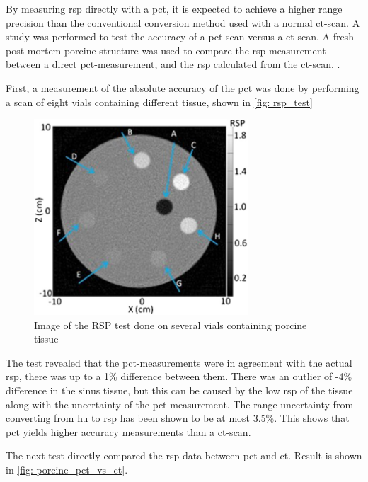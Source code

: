 \documentclass[main.tex]{subfiles}
\begin{document}
By measuring \gls{rsp} directly with a \gls{pct}, it is expected to achieve a higher range precision than the conventional conversion method used with a normal ct-scan. A study was performed to test the accuracy of a \gls{pct}-scan versus a \gls{ct}-scan. A fresh post-mortem porcine structure was used to compare the \gls{rsp} measurement between a direct \gls{pct}-measurement, and the \gls{rsp} calculated from the \gls{ct}-scan.  \cite{porcine_2021}.

First, a measurement of the absolute accuracy of the \gls{pct} was done by performing a scan of eight vials containing different tissue, shown in \autoref{fig: rsp_test}

\begin{figure}[!htpb]
    \centering
    \includegraphics[width=8cm ]{images/porcine_phantom.jpg}
    \caption{Image of the RSP test done on several vials containing porcine tissue\cite{porcine_2021}}
    \label{fig: rsp_test}
\end{figure}
\FloatBarrier

The test revealed that the \gls{pct}-measurements were in agreement with the actual \gls{rsp}, there was up to a 1\% difference between them. There was an outlier of -4\% difference in the sinus tissue, but this can be caused by the low \gls{rsp} of the tissue along with the uncertainty of the \gls{pct} measurement. The range uncertainty from converting from \gls{hu} to \gls{rsp} has been shown to be at most 3.5\%\cite{Paganetti_2012}. This shows that \gls{pct} yields higher accuracy measurements than a \gls{ct}-scan. 


The next test directly compared the \gls{rsp} data between \gls{pct} and \gls{ct}. Result is shown in \autoref{fig: porcine_pct_vs_ct}.
\end{document}
